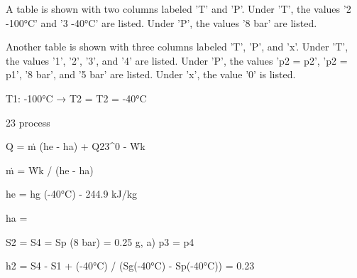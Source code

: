 A table is shown with two columns labeled 'T' and 'P'. Under 'T', the values '2 -100°C' and '3 -40°C' are listed. Under 'P', the values '8 bar' are listed.

Another table is shown with three columns labeled 'T', 'P', and 'x'. Under 'T', the values '1', '2', '3', and '4' are listed. Under 'P', the values 'p2 = p2', 'p2 = p1', '8 bar', and '5 bar' are listed. Under 'x', the value '0' is listed.

T1: -100°C → T2 = T2 = -40°C

23 process

Q = ṁ (he - ha) + Q23^0 - Ẇk

ṁ = Ẇk / (he - ha)

he = hg (-40°C) - 244.9 kJ/kg

ha = 

S2 = S4 = Sp (8 bar) = 0.25 g, a) p3 = p4

h2 = S4 - S1 + (-40°C) / (Sg(-40°C) - Sp(-40°C)) = 0.23